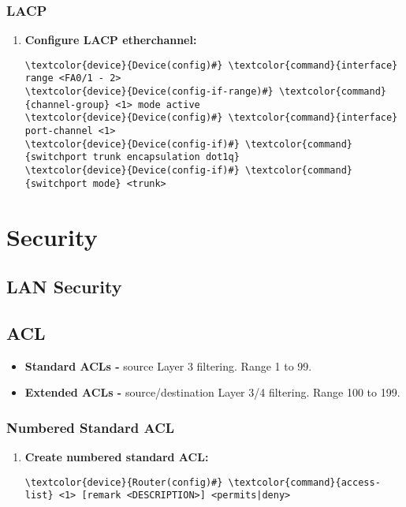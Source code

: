 \documentclass[10pt, a4paper, onecolumn, oneside, titlepage, openany]{book}
\begin{document}
\subsection{LACP}
\begin{enumerate}
    \item \textbf{Configure LACP etherchannel:}
\begin{Verbatim}[commandchars=\\\{\}]
\textcolor{device}{Device(config)#} \textcolor{command}{interface} range <FA0/1 - 2>
\textcolor{device}{Device(config-if-range)#} \textcolor{command}{channel-group} <1> mode active
\textcolor{device}{Device(config)#} \textcolor{command}{interface} port-channel <1>
\textcolor{device}{Device(config-if)#} \textcolor{command}{switchport trunk encapsulation dot1q}
\textcolor{device}{Device(config-if)#} \textcolor{command}{switchport mode} <trunk>
\end{Verbatim}
\end{enumerate}



\chapter{Security}
\section{LAN Security}
\section{ACL}
\begin{itemize}
    \item \textbf{Standard ACLs -} source Layer 3 filtering. Range 1 to 99.
    \item \textbf{Extended ACLs -} source/destination Layer 3/4 filtering. Range 100 to 199.
\end{itemize}
\subsection{Numbered Standard ACL}
\begin{enumerate}
    \item \textbf{Create numbered standard ACL:}
\begin{Verbatim}[commandchars=\\\{\}]
\textcolor{device}{Router(config)#} \textcolor{command}{access-list} <1> [remark <DESCRIPTION>] <permits|deny>
\end{Verbatim}
\end{enumerate}
\end{document}
